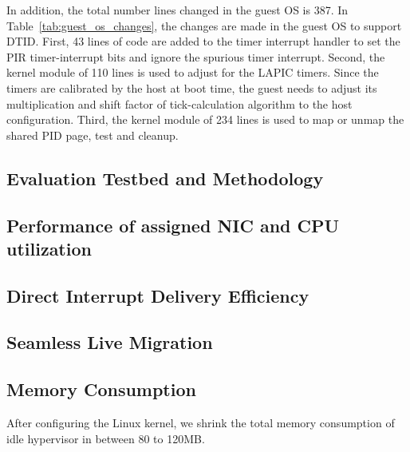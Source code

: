 In addition, the total number lines changed in the guest OS is
387. In Table~\ref{tab:guest_os_changes}, the changes are made
in the guest OS to support DTID. First, 43 lines of code are
added to the timer interrupt handler to set the PIR
timer-interrupt bits and ignore the spurious timer interrupt.
Second, the kernel module of 110 lines is used to adjust for
the LAPIC timers. Since the timers are calibrated by the host
at boot time, the guest needs to adjust its multiplication and
shift factor of tick-calculation algorithm to the host
configuration. Third, the kernel module of 234 lines is used
to map or unmap the shared PID page, test and cleanup.

\subsection{Evaluation Testbed and Methodology}


\subsection{Performance of assigned NIC and CPU utilization}


\subsection{Direct Interrupt Delivery Efficiency}


\subsection{Seamless Live Migration}


\subsection{Memory Consumption}
After configuring the Linux kernel, we shrink the total memory
consumption of idle hypervisor in between 80 to 120MB.

